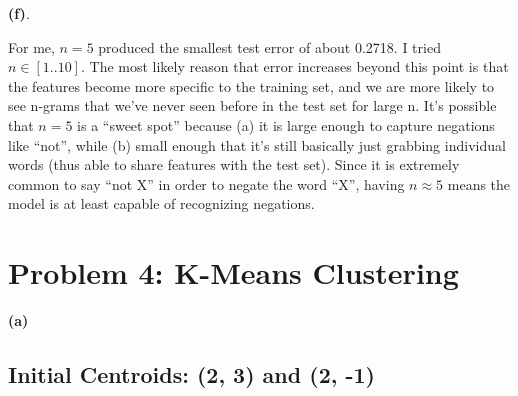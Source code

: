 \documentclass[11pt]{article}
\newcommand\myspace[1][]{\vspace{#1\bigskipamount}}
\begin{document}
\clearpage
\textbf{(f)}. 
	
For me, $n=5$ produced the smallest test error of about 0.2718. I tried $n \in [1..10]$. The most likely reason that error increases beyond this point is that the features become more specific to the training set, and we are more likely to see n-grams that we've never seen before in the test set for large n. It's possible that $n=5$ is a ``sweet spot'' because (a) it is large enough to capture negations like ``not'', while (b) small enough that it's still basically just grabbing individual words (thus able to share features with the test set). Since it is extremely common to say ``not X'' in order to negate the word ``X'', having $n\approx 5$ means the model is at least capable of recognizing negations. 



\clearpage
\section*{Problem 4: K-Means Clustering}



\myspace
\textbf{(a)} 

\subsection*{Initial Centroids: (2, 3) and (2, -1)}
\end{document}
